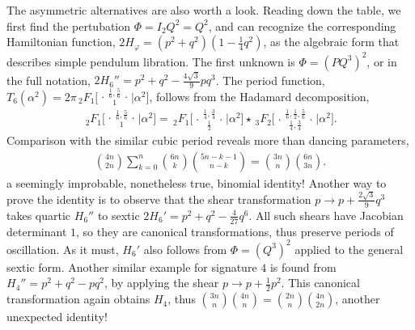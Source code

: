 \documentclass[nofootinbib,preprint]{revtex4-1}
\newcommand{\tFo}[3]{\,_2F_1 \bigg[ 
\genfrac..{0pt}{}{#1}{#2}\bigg| #3 \bigg]}
\newcommand{\tFoIn}[3]{\,_2F_1 \Big[ 
\genfrac..{0pt}{}{#1}{#2}\Big| #3 \Big]}
\begin{document}
The asymmetric alternatives are also worth a look. Reading down the table, we first 
find the pertubation $\Phi=I_2Q^2=Q^2$, and can recognize the corresponding Hamiltonian
function, $2H_{\varphi}=(p^2+q^2)(1-\frac{1}{4}q^2)$, as the algebraic form that describes simple 
pendulum libration. The first unknown is $\Phi=(PQ^3)^2$, or in the full notation, 
$2H_6''=p^2+q^2-\frac{4\sqrt{3}}{9}p q^3$. The period function, 
$T_6(\alpha^2)=2\pi\tFoIn{\frac{1}{6},\frac{5}{6}}{1}{\alpha^2}$,
follows from the Hadamard decomposition,
\begin{eqnarray}
\tFo{\frac{1}{6},\frac{5}{6}}{1}{\alpha^2}=
\tFo{\frac{1}{4},\frac{3}{4}}{\frac{1}{2}}{\alpha^2}
\star\,_3F_2 \bigg[ \genfrac..{0pt}{}{\frac{1}{6},\frac{1}{2},\frac{5}{6}}{\frac{1}{4},\frac{3}{4}}\Big| \alpha^2 \bigg]
 \nonumber.
\end{eqnarray}
Comparison with the similar cubic period reveals more than dancing parameters,
\begin{eqnarray}
\binom{4n}{2n}\sum_{k=0}^n \binom{6 n}{k}\binom{5 n - k - 1}{n-k}=\binom{3n}{n}\binom{6n}{3n}. \nonumber
\end{eqnarray}
a seemingly improbable, nonetheless true, binomial identity! Another way to prove the identity 
is to observe that the shear transformation $p \rightarrow p+\frac{2\sqrt{3}}{9}q^3$ takes 
quartic $H_6''$ to sextic $2H_6'=p^2+q^2-\frac{4}{27}q^6$. All such shears have Jacobian 
determinant $1$, so they are canonical transformations, thus preserve periods of oscillation.
As it must, $H_6'$ also follows  from $\Phi=(Q^3)^2$ applied to the general sextic form.  
Another similar example for signature $4$ is found from $H_4''=p^2+q^2-pq^2$, by applying 
the shear $p \rightarrow p+\frac{1}{2}p^2$. This canonical transformation again obtains $H_4$,
thus $\binom{3n}{n}\binom{4n}{n}=\binom{2n}{n}\binom{4n}{2n}$, another unexpected 
identity!
\end{document}
